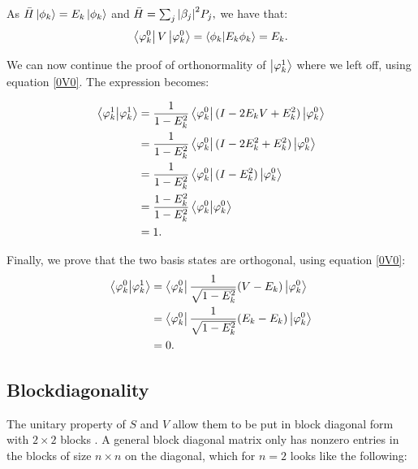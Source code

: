 As $\bar{H}\left\vert{\phi_k}\right\rangle = E_k\left\vert{\phi_k}\right\rangle$ and $\bar{H} = \sum_j \abs{\beta_j}^2  P_j,$ we have that:
\begin{equation} \label{0V0}
\left\langle{\varphi_k^0}\right\vert V \left\vert{\varphi_k^0}\right\rangle = \braket{\phi_k}{E_k \phi_k}
= E_k.
\end{equation}

We can now continue the proof of orthonormality of $\left\vert{\varphi_k^1}\right\rangle$ where we left off, using equation \ref{0V0}. The expression becomes:



\begin{align} \begin{split}
\braket{\varphi_k^1}{\varphi_k^1} &= \frac{1}{1 - E^2_k} \left\langle{\varphi_k^0}\right\vert (I - 2 E_kV + E_k^2) \left\vert{\varphi_k^0}\right\rangle\\
&= \frac{1}{1 - E^2_k} \left\langle{\varphi_k^0}\right\vert (I - 2 E_k^2 + E_k^2) \left\vert{\varphi_k^0}\right\rangle\\
&= \frac{1}{1 - E^2_k} \left\langle{\varphi_k^0}\right\vert (I -  E_k^2) \left\vert{\varphi_k^0}\right\rangle\\
&= \frac{1- E^2_k}{1 - E^2_k} \braket{\varphi_k^0}{\varphi_k^0}\\
&= 1.
\end{split} \end{align}

Finally, we prove that the two basis states are orthogonal,  using equation \ref{0V0}:
\begin{align} \begin{split}
\braket{\varphi_k^0}{\varphi_k^1} &= \left\langle{\varphi_k^0}\right\vert  \frac{1}{\sqrt{1 - E^2_k}}(V-E_k) \left\vert{\varphi_k^0}\right\rangle\\
&= \left\langle{\varphi_k^0}\right\vert  \frac{1}{\sqrt{1 - E^2_k}}(E_k-E_k) \left\vert{\varphi_k^0}\right\rangle\\
&= 0.
\end{split} \end{align}

\subsection{Blockdiagonality}

The unitary property of $S$ and $V$ allow them to be put in block diagonal form with $ 2 \times 2$ blocks \cite{poulin}. A general block diagonal matrix only has nonzero entries in the blocks of size $n \times n$ on the diagonal, which for $n = 2$ looks like the following:

